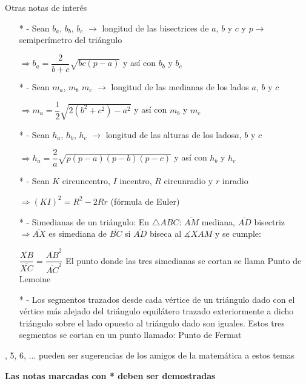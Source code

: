 \vspace{0.5cm}
\noindent Otras notas de interés
\begin{itemize}
    \item[* -] Sean $b_a$, $b_b$, $b_c$ $\rightarrow$ longitud de las bisectrices de $a$, $b$ y $c$ y $p \rightarrow$ semiperímetro del triángulo
    \item[] $\Longrightarrow b_a=\dfrac{2}{b+c}\sqrt{bc(p-a)}$ y así con $b_b$ y $b_c$
    \item[* -] Sean $m_a$, $m_b$ $m_c$ $\rightarrow$ longitud de las medianas de los lados $a$, $b$ y $c$
    \item[]$\Longrightarrow m_a = \dfrac{1}{2}\sqrt{2(b^2 + c^2)- a^2}$ y así con $m_b$ y $m_c$
    \item[* -] Sean $h_a$, $h_b$, $h_c$ $\rightarrow$ longitud de las alturas de los lados$a$, $b$ y $c$
    \item[] $\Longrightarrow h_a = \dfrac{2}{a}\sqrt{p(p-a)(p-b)(p-c)}$ y así con $h_b$ y $h_c$
    \item[* -] Sean $K$ circuncentro, $I$ incentro, $R$ circunradio y $r$ inradio
    \item[] $\Longrightarrow (KI)^2 = R^2 - 2Rr$ (fórmula de Euler)
    \item[* -] Simedianas de un triángulo: En $\triangle ABC$: $\overline{AM}$ mediana, $\overline{AD}$ bisectriz $\Longrightarrow \overline{AX}$ es simediana de $\overline{BC}$ si $\overline{AD}$ biseca al $\measuredangle XAM$ y se cumple:
    \item[] $\dfrac{\overline{XB}}{\overline{XC}}=\dfrac{\overline{AB}^2}{\overline{AC}^2}$ El punto donde las tres simedianas se cortan se llama Punto de Lemoine
    \item[* -] Los segmentos trazados desde cada vértice de un triángulo dado con el vértice más alejado del triángulo equilátero trazado exteriormente a dicho triángulo sobre el lado opuesto al triángulo dado son iguales. Estos tres segmentos se cortan en un punto llamado: Punto de Fermat 
\end{itemize}


\vspace{0.5cm}
, 5, 6, ... pueden ser sugerencias de los amigos de la matemática a estos temas

\vspace{0.5cm}
\begin{center}
    \textbf{Las notas marcadas con * deben ser demostradas}
\end{center}

